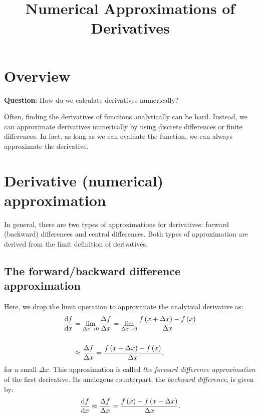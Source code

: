 \documentclass[12pt,letter]{article}
\title{{\bf Numerical Approximations of Derivatives} }
\date{}
\begin{document}
\maketitle
\vspace{-1.0in}





\section{Overview}
\vspace{12pt}
    \begin{mdframed}[backgroundcolor=blue!20] 
        {\bf Question}: How do we calculate derivatives numerically?
    \end{mdframed}
    
Often, finding the derivatives of functions analytically can be hard. Instead, we can  approximate derivatives numerically by using discrete differences or finite differences. In fact, as long as we can evaluate the function, we can always approximate the derivative. 

\section{Derivative (numerical) approximation}


In general, there are two types of approximations for derivatives: forward (backward) differences and central differences. Both types of approximation are derived from the limit definition of derivatives.

\subsection{The forward/backward difference approximation} 
Here, we drop the limit operation to approximate the analytical derivative as:
\begin{align}
        \dv{f}{x} &= \lim_{\Delta x \rightarrow 0}\frac{\Delta f}{\Delta x} 
                      = \lim_{\Delta x \rightarrow 0}\frac{f\left(x+\Delta x\right) - f\left(x\right)}{\Delta x} \notag \\ \notag\\
                      &\approx \frac{\Delta f}{\Delta x} = \frac{f\left(x+\Delta x\right) - f\left(x\right)}{\Delta x}, 
	\label{approx1}
\end{align}		
for a small $\Delta x$. This approximation is called {\em the forward difference approximation} of the first derivative. Its analogous counterpart, the {\em backward difference}, is given by: 
\begin{align}
        \dv{f}{x} \approx \frac{\Delta f}{\Delta x} = \frac{f\left(x\right)- f\left(x-\Delta x\right)}{\Delta x}.
	\label{approx2}
\end{align}
\newpage
\end{document}
